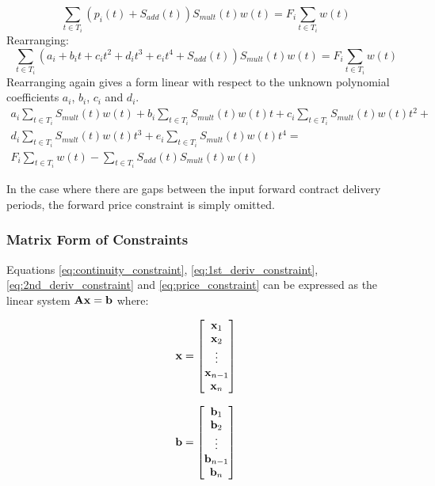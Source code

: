 \documentclass{article}
\begin{document}
\begin{equation}
    \sum_{t \in T_i} (p_i(t) + S_{add}(t)) S_{mult}(t)w(t) = 
    F_i \sum_{t \in T_i} w(t)
\end{equation}
Rearranging:
\begin{equation}
    \sum_{t \in T_i} (a_i + b_i t + c_i t^2 + d_i t^3 + e_i t^4  + 
    S_{add}(t)) S_{mult}(t)w(t) = F_i \sum_{t \in T_i} w(t)
\end{equation}
Rearranging again gives a form linear with respect to the unknown polynomial coefficients $a_i$, $b_i$, $c_i$ and $d_i$.
\begin{eqnarray}
    \label{eq:price_constraint}
    \nonumber
    a_i \sum_{t \in T_i} S_{mult}(t)w(t) +
    b_i \sum_{t \in T_i} S_{mult}(t)w(t) t +
    c_i \sum_{t \in T_i} S_{mult}(t)w(t) t^2 + \\
    \nonumber
    d_i \sum_{t \in T_i} S_{mult}(t)w(t) t^3 +
    e_i \sum_{t \in T_i} S_{mult}(t)w(t) t^4 = \\ 
    F_i \sum_{t \in T_i} w(t) - 
    \sum_{t \in T_i} S_{add}(t)S_{mult}(t)w(t)
\end{eqnarray}

In the case where there are gaps between the input forward contract delivery periods,
the forward price constraint is simply omitted.

\subsubsection{Matrix Form of Constraints}
Equations \ref{eq:continuity_constraint}, \ref{eq:1st_deriv_constraint}, \ref{eq:2nd_deriv_constraint} and
 \ref{eq:price_constraint} can be expressed as the linear system $\mathbf{Ax = b}$ where:

\begin{equation*}
    \mathbf{x} = \begin{bmatrix}
        \mathbf{x}_1 \\
        \mathbf{x}_2 \\
        \vdots \\
        \mathbf{x}_{n-1} \\
        \mathbf{x}_n \\
    \end{bmatrix}
\end{equation*}

\begin{equation*}
    \mathbf{b} = \begin{bmatrix}
        \mathbf{b}_1 \\
        \mathbf{b}_2 \\
        \vdots \\
        \mathbf{b}_{n-1} \\
        \mathbf{b}_n \\
    \end{bmatrix}
\end{equation*}
\end{document}

